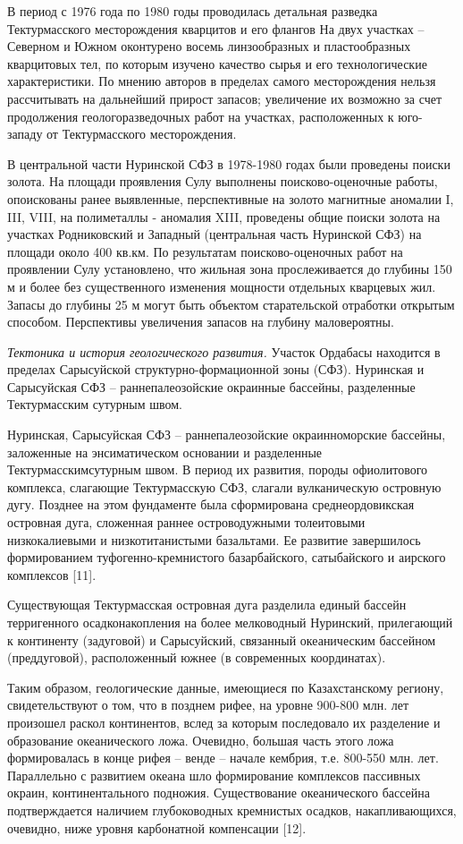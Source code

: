 В период с 1976 года по 1980 годы проводилась детальная разведка
Тектурмасского месторождения кварцитов и его флангов На двух участках --
Северном и Южном оконтурено восемь линзообразных и пластообразных
кварцитовых тел, по которым изучено качество сырья и его технологические
характеристики. По мнению авторов в пределах самого месторождения нельзя
рассчитывать на дальнейший прирост запасов; увеличение их возможно за
счет продолжения геологоразведочных работ на участках, расположенных к
юго-западу от Тектурмасского месторождения.

В центральной части Нуринской СФЗ в 1978-1980 годах были проведены
поиски золота. На площади проявления Сулу выполнены поисково-оценочные
работы, опоискованы ранее выявленные, перспективные на золото магнитные
аномалии I, III, VIII, на полиметаллы - аномалия XIII, проведены общие
поиски золота на участках Родниковский и Западный (центральная часть
Нуринской СФЗ) на площади около 400 кв.км. По результатам
поисково-оценочных работ на проявлении Сулу установлено, что жильная
зона прослеживается до глубины 150 м и более без существенного изменения
мощности отдельных кварцевых жил. Запасы до глубины 25 м могут быть
объектом старательской отработки открытым способом. Перспективы
увеличения запасов на глубину маловероятны.

\emph{Тектоника и история геологического развития.} Участок Ордабасы
находится в пределах Сарысуйской структурно-формационной зоны (СФЗ).
Нуринская и Сарысуйская СФЗ -- раннепалеозойские окраинные бассейны,
разделенные Тектурмасским сутурным швом.

Нуринская, Сарысуйская СФЗ -- раннепалеозойские окраинноморские
бассейны, заложенные на энсиматическом основании и разделенные
Тектурмасскимсутурным швом. В период их развития, породы офиолитового
комплекса, слагающие Тектурмасскую СФЗ, слагали вулканическую островную
дугу. Позднее на этом фундаменте была сформирована среднеордовикская
островная дуга, сложенная раннее островодужными толеитовыми
низкокалиевыми и низкотитанистыми базальтами. Ее развитие завершилось
формированием туфогенно-кремнистого базарбайского, сатыбайского и
аирского комплексов {[}11{]}.

Существующая Тектурмасская островная дуга разделила единый бассейн
терригенного осадконакопления на более мелководный Нуринский,
прилегающий к континенту (задуговой) и Сарысуйский, связанный
океаническим бассейном (преддуговой), расположенный южнее (в современных
координатах).

Таким образом, геологические данные, имеющиеся по Казахстанскому
региону, свидетельствуют о том, что в позднем рифее, на уровне 900-800
млн. лет произошел раскол континентов, вслед за которым последовало их
разделение и образование океанического ложа. Очевидно, большая часть
этого ложа формировалась в конце рифея -- венде -- начале кембрия, т.е.
800-550 млн. лет. Параллельно с развитием океана шло формирование
комплексов пассивных окраин, континентального подножия. Существование
океанического бассейна подтверждается наличием глубоководных кремнистых
осадков, накапливающихся, очевидно, ниже уровня карбонатной компенсации
{[}12{]}.


